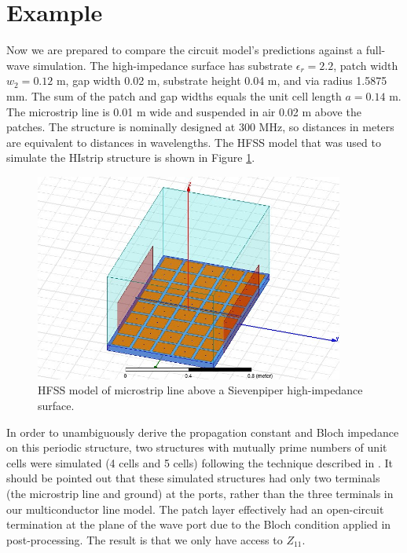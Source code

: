 \documentclass{allertonproc}
\begin{document}
\section{Example}
Now we are prepared to compare the circuit model's predictions against a full-wave simulation.  The high-impedance surface has substrate $\epsilon_r = 2.2$, patch width $w_2 = 0.12$ m, gap width 0.02 m, substrate height 0.04 m, and via radius 1.5875 mm.  The sum of the patch and gap widths equals the unit cell length $a = 0.14$ m.  The microstrip line is 0.01 m wide and suspended in air 0.02 m above the patches.    The structure is nominally designed at 300 MHz, so distances in meters are equivalent to distances in wavelengths.  The HFSS model that was used to simulate the HIstrip structure is shown in Figure \ref{HFSSmodelpic}. 
\begin{figure}[htb]
\begin{center}
\includegraphics[width=4in]{HFSSmodelpic}
\caption{HFSS model of microstrip line above a Sievenpiper high-impedance surface.}
\label{HFSSmodelpic}
\end{center}
\end{figure}

 In order to unambiguously derive the propagation constant and Bloch impedance on this periodic structure, two structures with mutually prime numbers of unit cells were simulated (4 cells and 5 cells) following the technique described in \cite{valerio}.  It should be pointed out that these simulated structures had only two terminals (the microstrip line and ground) at the ports, rather than the three terminals in our multiconductor line model.  The patch layer effectively had an open-circuit termination at the plane of the wave port due to the Bloch condition applied in post-processing.  The result is that we only have access to $Z_{11}$.
\end{document}
